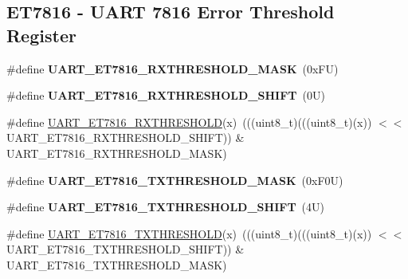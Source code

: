 \subsection*{E\+T7816 -\/ U\+A\+RT 7816 Error Threshold Register}
\begin{DoxyCompactItemize}
\item 
\mbox{\label{group___u_a_r_t___register___masks_ga9ef739359fd7d60427900938502e5100}} 
\#define {\bfseries U\+A\+R\+T\+\_\+\+E\+T7816\+\_\+\+R\+X\+T\+H\+R\+E\+S\+H\+O\+L\+D\+\_\+\+M\+A\+SK}~(0x\+F\+U)
\item 
\mbox{\label{group___u_a_r_t___register___masks_gacd8498adcff369769fb56dde33ce7465}} 
\#define {\bfseries U\+A\+R\+T\+\_\+\+E\+T7816\+\_\+\+R\+X\+T\+H\+R\+E\+S\+H\+O\+L\+D\+\_\+\+S\+H\+I\+FT}~(0\+U)
\item 
\#define \mbox{\hyperlink{group___u_a_r_t___register___masks_ga497482306b260f45732d82ac5503aba4}{U\+A\+R\+T\+\_\+\+E\+T7816\+\_\+\+R\+X\+T\+H\+R\+E\+S\+H\+O\+LD}}(x)~(((uint8\+\_\+t)(((uint8\+\_\+t)(x)) $<$$<$ U\+A\+R\+T\+\_\+\+E\+T7816\+\_\+\+R\+X\+T\+H\+R\+E\+S\+H\+O\+L\+D\+\_\+\+S\+H\+I\+FT)) \& U\+A\+R\+T\+\_\+\+E\+T7816\+\_\+\+R\+X\+T\+H\+R\+E\+S\+H\+O\+L\+D\+\_\+\+M\+A\+SK)
\item 
\mbox{\label{group___u_a_r_t___register___masks_ga6c3c5365dc3ba6ac54a4bd4330ff60cf}} 
\#define {\bfseries U\+A\+R\+T\+\_\+\+E\+T7816\+\_\+\+T\+X\+T\+H\+R\+E\+S\+H\+O\+L\+D\+\_\+\+M\+A\+SK}~(0x\+F0\+U)
\item 
\mbox{\label{group___u_a_r_t___register___masks_ga427963f9e067b0856aa8830cae622291}} 
\#define {\bfseries U\+A\+R\+T\+\_\+\+E\+T7816\+\_\+\+T\+X\+T\+H\+R\+E\+S\+H\+O\+L\+D\+\_\+\+S\+H\+I\+FT}~(4\+U)
\item 
\#define \mbox{\hyperlink{group___u_a_r_t___register___masks_ga0f26cca6a1f58b4b08ff7b471d66881d}{U\+A\+R\+T\+\_\+\+E\+T7816\+\_\+\+T\+X\+T\+H\+R\+E\+S\+H\+O\+LD}}(x)~(((uint8\+\_\+t)(((uint8\+\_\+t)(x)) $<$$<$ U\+A\+R\+T\+\_\+\+E\+T7816\+\_\+\+T\+X\+T\+H\+R\+E\+S\+H\+O\+L\+D\+\_\+\+S\+H\+I\+FT)) \& U\+A\+R\+T\+\_\+\+E\+T7816\+\_\+\+T\+X\+T\+H\+R\+E\+S\+H\+O\+L\+D\+\_\+\+M\+A\+SK)
\end{DoxyCompactItemize}
